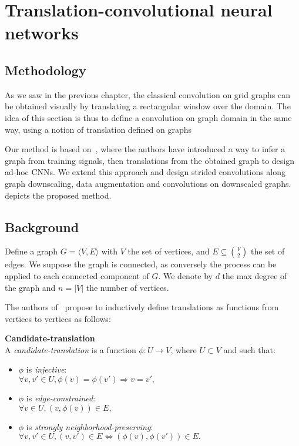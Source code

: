 \section{Translation-convolutional neural networks}

\subsection{Methodology}

As we saw in the previous chapter, the classical convolution on grid graphs can be obtained visually by translating a rectangular window over the domain. The idea of this section is thus to define a convolution on graph domain in the same way, using a notion of translation defined on graphs 




Our method is based on~\cite{pasdeloup2017convolutional}, where the authors have introduced a way to infer a graph from training signals, then translations from the obtained graph to design ad-hoc CNNs. We extend this approach and design strided convolutions along graph downscaling, data augmentation and convolutions on downscaled graphs.  depicts the proposed method.



\subsection{Background}

Define a graph $G = \langle V, E \rangle$ with $V$ the set of vertices, and $E \subseteq\binom{V}{2}$ the set of edges. We suppose the graph is connected, as conversely the process can be applied to each connected component of $G$. We denote by $d$ the max degree of the graph and $n = |V|$ the number of vertices.

The authors of~\cite{pasdeloup2017convolutional} propose to inductively define translations as functions from vertices to vertices as follows:

\begin{definition}\textbf{Candidate-translation}\\
  A \emph{candidate-translation} is a function $\phi: U \to V$, where $U \subset V$ and such that:
  \begin{itemize}[noitemsep,nolistsep]
  \item $\phi$ is \emph{injective}:\\
  $\forall v,v' \in U, \phi(v) = \phi(v') \Rightarrow v = v',$
  \item $\phi$ is \emph{edge-constrained}:\\
  $\forall v \in U, (v,\phi(v)) \in E,$
  \item $\phi$ is \emph{strongly neighborhood-preserving}:\\
  $\forall v,v' \in U, (v,v')\in E \Leftrightarrow (\phi(v),\phi(v')) \in E.$
  \end{itemize}
\end{definition}

